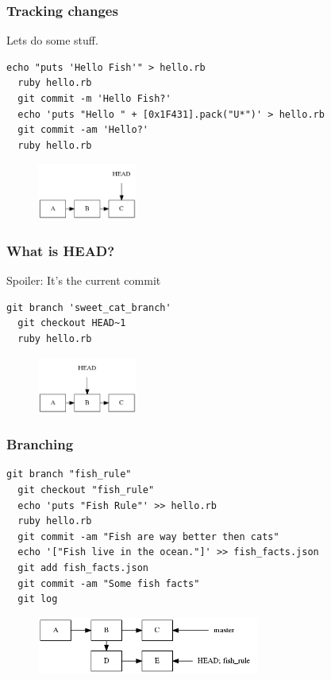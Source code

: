 \documentclass{beamer}
\begin{document}
\begin{frame}[fragile]
\frametitle{Tracking changes}

Lets do some stuff.

\vspace{1em}

\begin{lstlisting}[frame=single]
  echo "puts 'Hello Fish'" > hello.rb
  ruby hello.rb
  git commit -m 'Hello Fish?'
  echo 'puts "Hello " + [0x1F431].pack("U*")' > hello.rb
  git commit -am 'Hello?'
  ruby hello.rb
\end{lstlisting}

\begin{figure}[p]
  \centering
  \includegraphics[height=5em]{some_commits.png}
\end{figure}

\end{frame}

\begin{frame}[fragile]
\frametitle{What is HEAD?}

Spoiler: It's the current commit

\vspace{1em}

\begin{lstlisting}[frame=single]
  git branch 'sweet_cat_branch'
  git checkout HEAD~1
  ruby hello.rb
\end{lstlisting}

\begin{figure}[p]
  \centering
  \includegraphics[height=5em]{head.png}
\end{figure}

\end{frame}

\begin{frame}[fragile]
\frametitle{Branching}

\begin{lstlisting}[frame=single]
  git branch "fish_rule"
  git checkout "fish_rule"
  echo 'puts "Fish Rule"' >> hello.rb
  ruby hello.rb
  git commit -am "Fish are way better then cats"
  echo '["Fish live in the ocean."]' >> fish_facts.json
  git add fish_facts.json
  git commit -am "Some fish facts"
  git log
\end{lstlisting}

\begin{figure}[p]
  \centering
  \includegraphics[height=5em]{fish.png}
\end{figure}

\end{frame}
\end{document}
